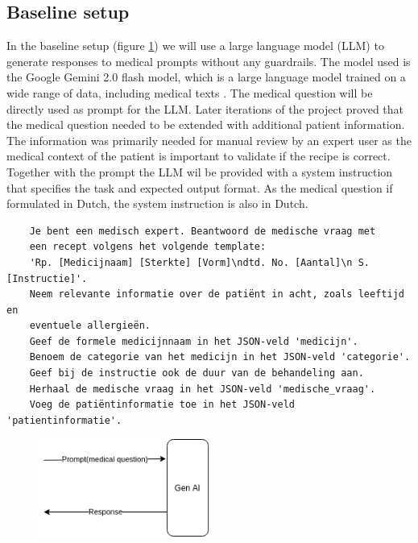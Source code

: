 \subsection{Baseline setup}
In the baseline setup (figure \ref{fig:baselineSetup}) we will use a large language model (LLM) to generate responses to medical prompts without any guardrails.
The model used is the Google Gemini 2.0 flash model, which is a large language model trained on a wide range of data, including medical texts \citep{saab2024capabilities}.
The medical question will be directly used as prompt for the LLM.
Later iterations of the project proved that the medical question needed to be extended with additional patient information.
The information was primarily needed for manual review by an expert user as the medical context of the patient is important to validate if the recipe is correct.
Together with the prompt the LLM wil be provided with a system instruction that specifies the task and expected output format.
As the medical question if formulated in Dutch, the system instruction is also in Dutch.
\begin{verbatim}
    Je bent een medisch expert. Beantwoord de medische vraag met
    een recept volgens het volgende template:
    'Rp. [Medicijnaam] [Sterkte] [Vorm]\ndtd. No. [Aantal]\n S. [Instructie]'.
    Neem relevante informatie over de patiënt in acht, zoals leeftijd en
    eventuele allergieën.
    Geef de formele medicijnnaam in het JSON-veld 'medicijn'.
    Benoem de categorie van het medicijn in het JSON-veld 'categorie'.
    Geef bij de instructie ook de duur van de behandeling aan.
    Herhaal de medische vraag in het JSON-veld 'medische_vraag'.
    Voeg de patiëntinformatie toe in het JSON-veld 'patientinformatie'.
\end{verbatim}

\begin{figure}[H]
    \includegraphics[width=0.5\textwidth]{figures/baselineSetup.png}
    \label{fig:baselineSetup}
\end{figure}

